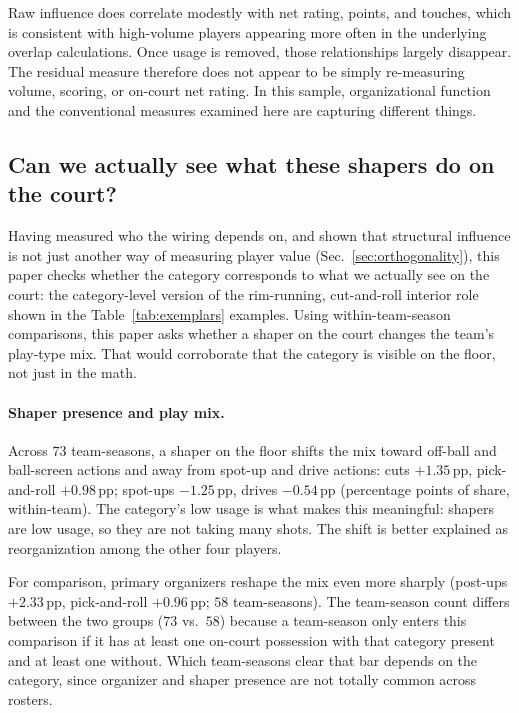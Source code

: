 \documentclass[11pt]{article}
\begin{document}
Raw influence does correlate modestly with net rating, points, and touches, which is
consistent with high-volume players appearing more often in the underlying overlap
calculations. Once usage is removed, those relationships largely disappear. The residual
measure therefore does not appear to be simply re-measuring volume, scoring, or on-court
net rating. In this sample, organizational function and the conventional measures examined
here are capturing different things.

\subsection{Can we actually see what these shapers do on the court?}
\label{sec:behavior}

Having measured who the wiring depends on, and shown that structural influence is not just
another way of measuring player value (Sec.~\ref{sec:orthogonality}), this paper checks
whether the category corresponds to what we actually see on the court: the category-level
version of the rim-running, cut-and-roll interior role shown in the Table~\ref{tab:exemplars}
examples. Using within-team-season comparisons, this paper asks whether a shaper on the court
changes the team's play-type mix. That would corroborate that the category is visible on the
floor, not just in the math.

\paragraph{Shaper presence and play mix.}
Across $73$ team-seasons, a shaper on the floor shifts the mix toward off-ball and
ball-screen actions and away from spot-up and drive actions: cuts $+1.35$\,pp, pick-and-roll
$+0.98$\,pp; spot-ups $-1.25$\,pp, drives $-0.54$\,pp (percentage points of share,
within-team). The category's low usage is what makes this meaningful: shapers are low usage,
so they are not taking many shots. The shift is better explained as reorganization among the
other four players.

For comparison, primary organizers reshape the mix even more sharply (post-ups $+2.33$\,pp,
pick-and-roll $+0.96$\,pp; $58$ team-seasons). The team-season count differs between the two
groups ($73$ vs.\ $58$) because a team-season only enters this comparison if it has at least
one on-court possession with that category present and at least one without. Which
team-seasons clear that bar depends on the category, since organizer and shaper presence are
not totally common across rosters.
\end{document}
